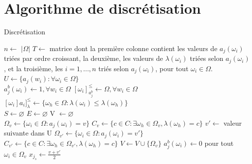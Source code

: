 \documentclass[a4paper]{article}
\begin{document}
\appendix
\newpage

\section{Algorithme de discrétisation}
\label{appendix:discretize}

\begin{algorithm}[H]
\caption{Discrétisation}
\begin{algorithmic}
\State {}
\State {}
\State {}

\State $n\gets$ $| \Omega |$ 
\State $T \gets $ matrice dont la première colonne contient les valeurs de $a_j(\omega_i)$ triées par ordre croissant, la deuxième, les valeurs de $\lambda(\omega_i)$ triées selon $a_j(\omega_i)$, et la troisième, les $i=1,...,n$ triés selon $a_j(\omega_i)$, pour tout $\omega_i \in \Omega$.
\State $U\gets \{a_j(w_i) : \forall \omega_i \in \Omega\}$  \\

\State $a^{b}_j(\omega_i) \gets 1, \forall w_i \in \Omega$ 
\State $[\omega_i]^{\leq}_{a^{b}_j} \gets \Omega, \forall w_i \in \Omega$ 
\State $[\omega_i]a_i]^{\leq}_{\lambda} \gets \{\omega_h \in \Omega : \lambda(\omega_i) \leq \lambda(\omega_h)\}$ \\

\State $S \gets \varnothing $ 
\State $E \gets \varnothing $ 
\State V $\gets \varnothing $  \\

 
    \State $\Omega_{v} \gets \{\omega_i \in \Omega : a_j(\omega_i) = v\}$
    \State $C_{v} \gets \{c \in C : \exists \omega_h \in \Omega_{v}, \lambda(\omega_h) = c\}$
    \State $v' \gets$ valeur suivante dans U
    \State $\Omega_{v'} \gets \{\omega_i \in \Omega : a_j(\omega_i) = v'\}$
    \State $C_{v'} \gets \{c \in C : \exists \omega_h \in \Omega_{v'}, \lambda(\omega_h) = c\}$
    \State $V \gets V \cup \{\Omega_{v}\}$    
    \State $a^{b}_j(\omega_i) \gets 0$ pour tout $\omega_i \in \Omega_{v}$ 
    \State $x_{j_s}\gets \frac{v + v'}{2}$\\
    

\end{algorithmic}
\end{algorithm}
\end{document}

